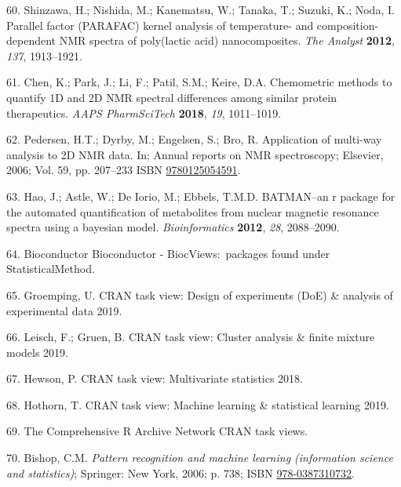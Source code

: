 \documentclass[]{article}
\begin{document}
\leavevmode\hypertarget{ref-shinzawa_2012}{}%
60. Shinzawa, H.; Nishida, M.; Kanematsu, W.; Tanaka, T.; Suzuki, K.; Noda, I. Parallel factor (PARAFAC) kernel analysis of temperature- and composition-dependent NMR spectra of poly(lactic acid) nanocomposites. \emph{The Analyst} \textbf{2012}, \emph{137}, 1913--1921.

\leavevmode\hypertarget{ref-chen_2018}{}%
61. Chen, K.; Park, J.; Li, F.; Patil, S.M.; Keire, D.A. Chemometric methods to quantify 1D and 2D NMR spectral differences among similar protein therapeutics. \emph{AAPS PharmSciTech} \textbf{2018}, \emph{19}, 1011--1019.

\leavevmode\hypertarget{ref-pedersen_2006}{}%
62. Pedersen, H.T.; Dyrby, M.; Engelsen, S.; Bro, R. Application of multi-way analysis to 2D NMR data. In; Annual reports on NMR spectroscopy; Elsevier, 2006; Vol. 59, pp. 207--233 ISBN \href{https://worldcat.org/isbn/9780125054591}{9780125054591}.

\leavevmode\hypertarget{ref-hao_2012}{}%
63. Hao, J.; Astle, W.; De Iorio, M.; Ebbels, T.M.D. BATMAN--an r package for the automated quantification of metabolites from nuclear magnetic resonance spectra using a bayesian model. \emph{Bioinformatics} \textbf{2012}, \emph{28}, 2088--2090.

\leavevmode\hypertarget{ref-bioconductor_website_ndb}{}%
64. Bioconductor Bioconductor - BiocViews:~packages found under StatisticalMethod.

\leavevmode\hypertarget{ref-groemping_website_2019}{}%
65. Groemping, U. CRAN task view: Design of experiments (DoE) \& analysis of experimental data 2019.

\leavevmode\hypertarget{ref-leisch_website_2019}{}%
66. Leisch, F.; Gruen, B. CRAN task view: Cluster analysis \& finite mixture models 2019.

\leavevmode\hypertarget{ref-hewson_website_2018}{}%
67. Hewson, P. CRAN task view: Multivariate statistics 2018.

\leavevmode\hypertarget{ref-hothorn_website_2019}{}%
68. Hothorn, T. CRAN task view: Machine learning \& statistical learning 2019.

\leavevmode\hypertarget{ref-thecomprehensiverarchivenetwork_website_nda}{}%
69. The Comprehensive R Archive Network CRAN task views.

\leavevmode\hypertarget{ref-bishop_2006}{}%
70. Bishop, C.M. \emph{Pattern recognition and machine learning (information science and statistics)}; Springer: New York, 2006; p. 738; ISBN \href{https://worldcat.org/isbn/978-0387310732}{978-0387310732}.
\end{document}
